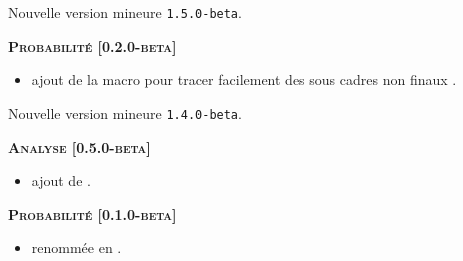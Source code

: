 \documentclass[12pt,a4paper]{book}
\begin{document}
\begin{description}
\begin{itemize}[itemsep=.5em]
    
\end{itemize}


\separation

\end{description}\begin{description}
\medskip
\item[2020-07-23] Nouvelle version mineure \verb+1.5.0-beta+.




\begin{center}
    \textbf{\textsc{Probabilité [0.2.0-beta]}}
\end{center}

\begin{itemize}[itemsep=.5em]
    \item {}
          ajout de la macro  pour tracer facilement des sous cadres non \og finaux \fg.

    
\end{itemize}


\separation

\end{description}\begin{description}
\medskip
\item[2020-07-22] Nouvelle version mineure \verb+1.4.0-beta+.




\begin{center}
    \textbf{\textsc{Analyse [0.5.0-beta]}}
\end{center}

\begin{itemize}[itemsep=.5em]
    \item {}
          ajout de .

    
\end{itemize}


\separation




\begin{center}
    \textbf{\textsc{Probabilité [0.1.0-beta]}}
\end{center}

\begin{itemize}[itemsep=.5em]
    \item {}
           renommée en  .


\end{itemize}
\end{description}
\end{document}
